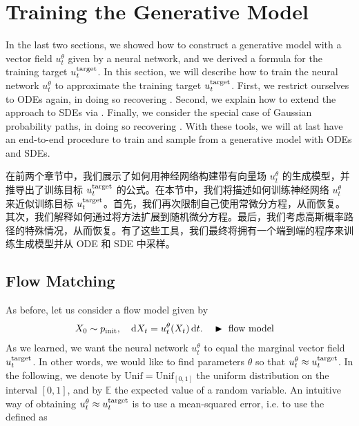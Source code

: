\section{Training the Generative Model}
\label{sec:training_generative_models}
In the last two sections, we showed how to construct a generative model with a vector field $u_t^\theta$ given by a neural network, and we derived a formula for the training target $u^{\text{target}}_t$. In this section, we will describe how to train the neural network $u_t^\theta$ to approximate the training target $u^{\text{target}}_t$. First, we restrict ourselves to ODEs again, in doing so recovering . Second, we explain how to extend the approach to SDEs via . Finally, we consider the special case of Gaussian probability paths, in doing so recovering . With these tools, we will at last have an end-to-end procedure to train and sample from a generative model with ODEs and SDEs.

在前两个章节中，我们展示了如何用神经网络构建带有向量场 $u_t^\theta$ 的生成模型，并推导出了训练目标 $u^{\text{target}}_t$ 的公式。在本节中，我们将描述如何训练神经网络 $u_t^\theta$ 来近似训练目标 $u^{\text{target}}_t$。首先，我们再次限制自己使用常微分方程，从而恢复。其次，我们解释如何通过将方法扩展到随机微分方程。最后，我们考虑高斯概率路径的特殊情况，从而恢复。有了这些工具，我们最终将拥有一个端到端的程序来训练生成模型并从 ODE 和 SDE 中采样。

\subsection{Flow Matching}

As before, let us consider a flow model given by
\begin{align}
\label{eq:ode_model}
 X_0&\sim p_{\rm{init}},\quad \mathrm{d} X_t = u_t^\theta(X_t)\,\mathrm{d} t. &&\blacktriangleright\,\,\text{flow model}
\end{align}
As we learned, we want the neural network $u_t^\theta$ to equal the marginal vector field $u^{\text{target}}_t$. In other words, we would like to find parameters $\theta$ so that $u_t^\theta\approx u^{\text{target}}_t$. In the following, we denote by $\text{Unif}=\text{Unif}_{[0,1]}$ the uniform distribution on the interval $[0,1]$, and by $\mathbb{E}$ the expected value of a random variable. An intuitive way of obtaining $u_t^\theta\approx u^{\text{target}}_t$ is to use a mean-squared error, i.e. to use the  defined as


